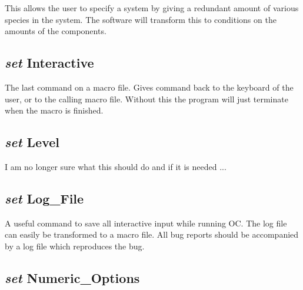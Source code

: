 \documentclass[12pt]{article}
\begin{document}
This allows the user to specify a system by giving a redundant amount
of various species in the system.  The software will transform this to
conditions on the amounts of the components.

\subsection{{\em set} Interactive}

The last command on a macro file.  Gives command back to the keyboard
of the user, or to the calling macro file.  Without this the program
will just terminate when the macro is finished.

\subsection{{\em set} Level}

I am no longer sure what this should do and if it is needed ...

\subsection{{\em set} Log\_File}

A useful command to save all interactive input while running OC.  The
log file can easily be transformed to a macro file.  All bug reports
should be accompanied by a log file which reproduces the bug.

\subsection{{\em set} Numeric\_Options}
\end{document}
